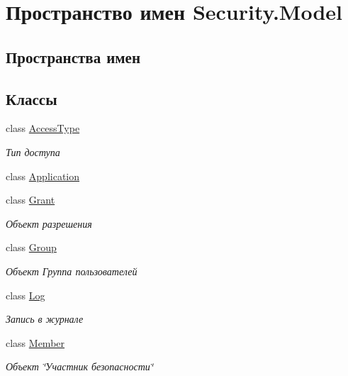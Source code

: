 \hypertarget{namespace_security_1_1_model}{}\section{Пространство имен Security.\+Model}
\label{namespace_security_1_1_model}
\subsection*{Пространства имен}
\begin{DoxyCompactItemize}
\end{DoxyCompactItemize}
\subsection*{Классы}
\begin{DoxyCompactItemize}
\item 
class \hyperlink{class_security_1_1_model_1_1_access_type}{Access\+Type}
\begin{DoxyCompactList}\small\item\em Тип доступа \end{DoxyCompactList}\item 
class \hyperlink{class_security_1_1_model_1_1_application}{Application}
\item 
class \hyperlink{class_security_1_1_model_1_1_grant}{Grant}
\begin{DoxyCompactList}\small\item\em Объект разрешения \end{DoxyCompactList}\item 
class \hyperlink{class_security_1_1_model_1_1_group}{Group}
\begin{DoxyCompactList}\small\item\em Объект Группа пользователей \end{DoxyCompactList}\item 
class \hyperlink{class_security_1_1_model_1_1_log}{Log}
\begin{DoxyCompactList}\small\item\em Запись в журнале \end{DoxyCompactList}\item 
class \hyperlink{class_security_1_1_model_1_1_member}{Member}
\begin{DoxyCompactList}\small\item\em Объект \char`\"{}Участник безопасности\char`\"{} \end{DoxyCompactList}\item 

\end{DoxyCompactItemize}
